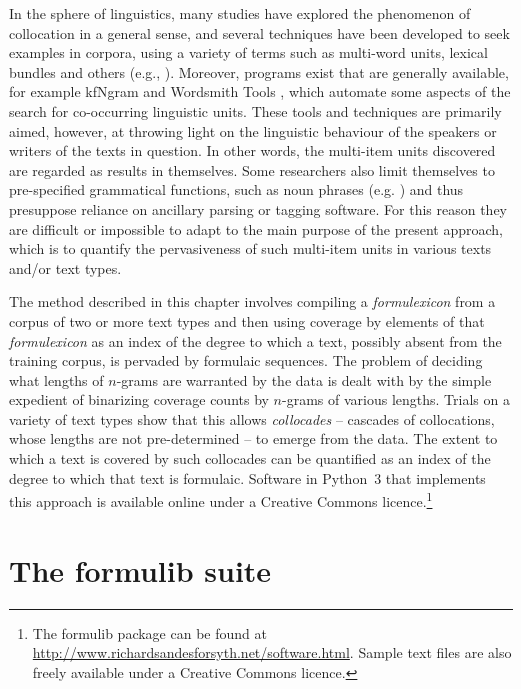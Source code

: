\documentclass[output=paper]{langscibook}
\begin{document}
In the sphere of linguistics, many studies have explored the phenomenon of collocation in a general sense, and several techniques have been developed to seek examples in corpora, using a variety of terms such as multi-word units, lexical bundles and others (e.g., \citealt{ShimohataEtAl1999,ZhangEtAl2009, KilgarriffEtAl2012}). Moreover, programs exist that are generally available, for example kfNgram \citep{Fletcher2012} and Wordsmith Tools \citep{Scott2020}, which automate some aspects of the search for co-occurring linguistic units. These tools and techniques are primarily aimed, however, at throwing light on the linguistic behaviour of the speakers or writers of the texts in question. In other words, the multi-item units discovered are regarded as results in themselves. Some researchers also limit themselves to pre-specified grammatical functions, such as noun phrases (e.g. \citealt{Daille2003,ZhangEtAl2009}) and thus presuppose reliance on ancillary parsing or tagging software. For this reason they are difficult or impossible to adapt to the main purpose of the present approach, which is to quantify the pervasiveness of such multi-item units in various texts and\slash or text types.

The method described in this chapter involves compiling a \textit{formulexicon} from a corpus of two or more text types and then using coverage by elements of that \textit{formulexicon} as an index of the degree to which a text, possibly absent from the training corpus, is pervaded by formulaic sequences. The problem of deciding what lengths of $n$-grams are warranted by the data is dealt with by the simple expedient of binarizing coverage counts by $n$-grams of various lengths. Trials on a variety of text types show that this allows \textit{collocades} -- cascades of collocations, whose lengths are not pre-determined -- to emerge from the data. The extent to which a text is covered by such collocades can be quantified as an index of the degree to which that text is formulaic. Software in Python~3 that implements this approach is available online under a Creative Commons licence.\footnote{The formulib package can be found at \url{http://www.richardsandesforsyth.net/software.html}. Sample text files are also freely available under a Creative Commons licence.}

\section{The formulib suite}\label{sec:forsyth:2}
\end{document}
